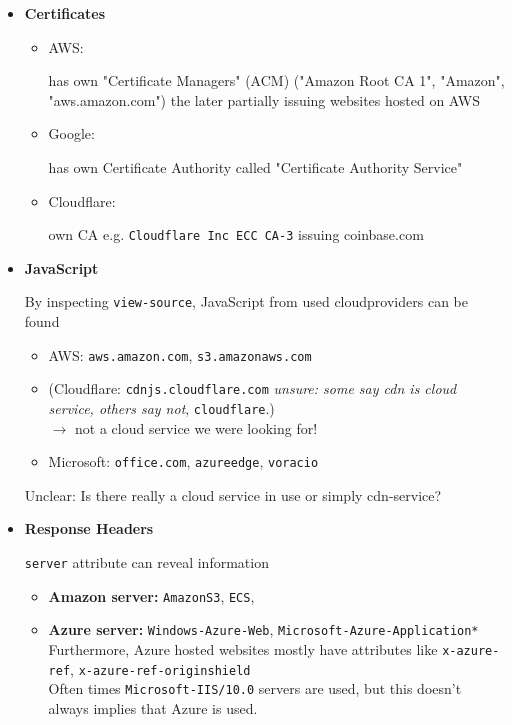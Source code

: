 \documentclass[12pt]{article}
\begin{document}
\begin{itemize}
\begin{itemize}
    \end{itemize}
    
    \item \textbf{Certificates}
    \begin{itemize}
        \item AWS: 
    
        has own "Certificate Managers" (ACM) ("Amazon Root CA 1", "Amazon", "aws.amazon.com") the later partially issuing websites hosted on AWS
        
        \item Google: 
    
        has own Certificate Authority called "Certificate Authority Service" 
        
        \item Cloudflare: 
    
        own CA e.g. \verb|Cloudflare Inc ECC CA-3| issuing coinbase.com
    \end{itemize}
    
    \item \textbf{JavaScript}

    By inspecting \verb|view-source|, JavaScript from used cloudproviders can be found
    \begin{itemize}
        \item AWS: \verb|aws.amazon.com|, \verb|s3.amazonaws.com| %
        \item (Cloudflare:
        \verb|cdnjs.cloudflare.com| \textit{unsure: some say cdn is cloud service, others say not}, \verb|cloudflare|.) \\
        $\rightarrow$ not a cloud service we were looking for!
        \item Microsoft: \verb|office.com|, \verb|azureedge|, \verb|voracio|
    \end{itemize}
    
    Unclear: Is there really a cloud service in use or simply cdn-service? 
    
    
    \item \textbf{Response Headers}
    
    \verb|server| attribute can reveal information 
    \begin{itemize}
        \item \textbf{Amazon server:} \verb|AmazonS3|, \verb|ECS|, 
        \item \textbf{Azure server:} \verb|Windows-Azure-Web|, \verb|Microsoft-Azure-Application*| \\
        Furthermore, Azure hosted websites mostly have attributes like \verb|x-azure-ref|, \verb|x-azure-ref-originshield| \\
        Often times \verb|Microsoft-IIS/10.0| servers are used, but this doesn't always implies  that Azure is used.
    \end{itemize}
    

\end{itemize}
\end{document}
